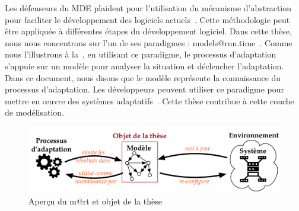 Les défenseurs du MDE plaident pour l'utilisation du mécanisme d'abstraction pour faciliter le développement des logiciels actuels~\cite{DBLP:journals/computer/Schmidt06, DBLP:conf/ifm/Kent02, DBLP:series/synthesis/2017Brambilla}. 
Cette méthodologie peut être appliquée à différentes étapes du développement logiciel. 
Dans cette thèse, nous nous concentrons sur l'un de ses paradigmes : models@run.time~\cite{DBLP:journals/computer/BlairBF09, DBLP:journals/computer/MorinBJFS09}. 
Comme nous l'illustrons à la~, en utilisant ce paradigme, le processus d'adaptation s'appuie sur un modèle pour analyser la situation et déclencher l'adaptation. 
Dans ce document, nous disons que le modèle représente la connaissance du processus d'adaptation. 
Les développeurs peuvent utiliser ce paradigme pour mettre en œuvre des systèmes adaptatifs~\cite{DBLP:journals/computer/MorinBJFS09, DBLP:conf/smartgridsec/0001FKNT14}.
Cette thèse contribue à cette couche de modélisation.




\begin{figure}
	\centering
	\includegraphics[width=.9\linewidth]{img/apdx-french/context/mart-focus}
	\caption{Aperçu du \gls{m@rt} et objet de la thèse}
	\label{fig:french:context:m@rt}
\end{figure}
